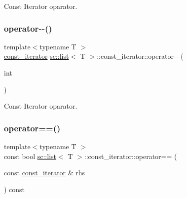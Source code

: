 Const Iterator oparator. 

\mbox{\label{classsc_1_1list_1_1const__iterator_a545f4c1885ebf352d130f6d0b5cb0599}} 
\subsubsection{\texorpdfstring{operator-\/-\/()}{operator--()}\hspace{0.1cm}{\footnotesize\ttfamily [2/2]}}
{\footnotesize\ttfamily template$<$typename T $>$ \\
\hyperlink{classsc_1_1list_1_1const__iterator}{const\+\_\+iterator} \hyperlink{classsc_1_1list}{sc\+::list}$<$ T $>$\+::const\+\_\+iterator\+::operator-\/-\/ (\begin{DoxyParamCaption}\item[{int}]{ }\end{DoxyParamCaption})\hspace{0.3cm}{\ttfamily [inline]}}



Const Iterator oparator. 

\mbox{\label{classsc_1_1list_1_1const__iterator_a269ce3049d056cac500ea337dc3845a8}} 
\subsubsection{\texorpdfstring{operator==()}{operator==()}}
{\footnotesize\ttfamily template$<$typename T $>$ \\
const bool \hyperlink{classsc_1_1list}{sc\+::list}$<$ T $>$\+::const\+\_\+iterator\+::operator== (\begin{DoxyParamCaption}\item[{const \hyperlink{classsc_1_1list_1_1const__iterator}{const\+\_\+iterator} \&}]{rhs }\end{DoxyParamCaption}) const\hspace{0.3cm}{\ttfamily [inline]}}




